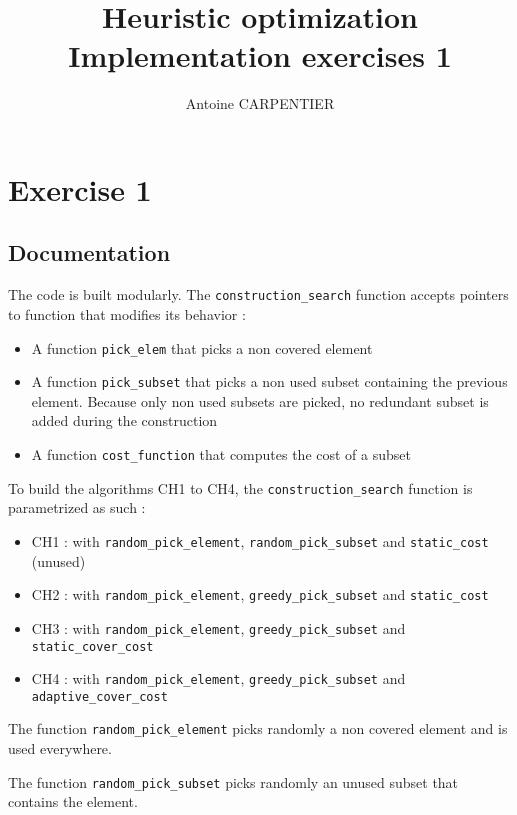 \documentclass[a4paper,12pt]{article}
\author{Antoine CARPENTIER}
\title{Heuristic optimization\\ \small Implementation exercises 1}
\begin{document}
\maketitle

\section{Exercise 1}

\subsection{Documentation}

The code is built modularly. The \texttt{construction\_search} function accepts pointers to function that modifies its behavior : 

\begin{itemize}
    \item A function \texttt{pick\_elem} that picks a non covered element
    \item A function \texttt{pick\_subset} that picks a non used subset containing the previous element. Because only non used subsets are picked, no redundant subset is added during the construction
    \item A function \texttt{cost\_function} that computes the cost of a subset
\end{itemize}

To build the algorithms CH1 to CH4, the \texttt{construction\_search} function is parametrized as such : 

\begin{itemize}
    \item CH1 : with \texttt{random\_pick\_element}, \texttt{random\_pick\_subset} and \texttt{static\_cost} (unused)
    \item CH2 : with \texttt{random\_pick\_element}, \texttt{greedy\_pick\_subset} and \texttt{static\_cost}
    \item CH3 : with \texttt{random\_pick\_element}, \texttt{greedy\_pick\_subset} and \texttt{static\_cover\_cost}
    \item CH4 : with \texttt{random\_pick\_element}, \texttt{greedy\_pick\_subset} and \texttt{adaptive\_cover\_cost}
\end{itemize}

The function \texttt{random\_pick\_element} picks randomly a non covered element and is used everywhere.

The function \texttt{random\_pick\_subset} picks randomly an unused subset that contains the element.
\end{document}
